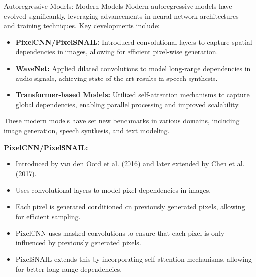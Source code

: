\begin{frame}[allowframebreaks]{Autoregressive Models: Modern Models}
    Modern autoregressive models have evolved significantly, leveraging advancements in neural network architectures and training techniques. Key developments include:

    \begin{itemize}
        \item \textbf{PixelCNN/PixelSNAIL:} Introduced convolutional layers to capture spatial dependencies in images, allowing for efficient pixel-wise generation.
        \item \textbf{WaveNet:} Applied dilated convolutions to model long-range dependencies in audio signals, achieving state-of-the-art results in speech synthesis.
        \item \textbf{Transformer-based Models:} Utilized self-attention mechanisms to capture global dependencies, enabling parallel processing and improved scalability.
    \end{itemize}

    These modern models have set new benchmarks in various domains, including image generation, speech synthesis, and text modeling.
    
    \framebreak
    
    \textbf{PixelCNN/PixelSNAIL:}
    \begin{itemize}
        \item Introduced by van den Oord et al. (2016) and later extended by Chen et al. (2017).
        \item Uses convolutional layers to model pixel dependencies in images.
        \item Each pixel is generated conditioned on previously generated pixels, allowing for efficient sampling.
        \item PixelCNN uses masked convolutions to ensure that each pixel is only influenced by previously generated pixels.
        \item PixelSNAIL extends this by incorporating self-attention mechanisms, allowing for better long-range dependencies.
    \end{itemize}
    
    \framebreak
    

\end{frame}
